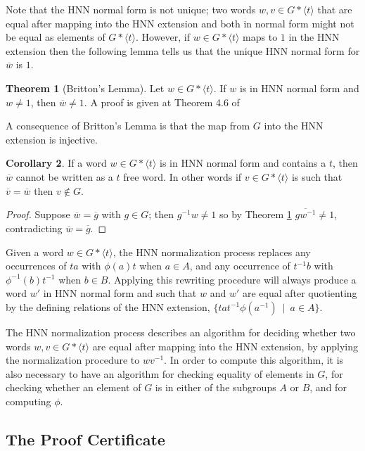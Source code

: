 \documentclass[12pt]{article} %
\theoremstyle{definition}
\newtheorem{thm}{Theorem}[subsubsection]
\theoremstyle{definition}
\newtheorem{corol}[thm]{Corollary}
\theoremstyle{definition}
\theoremstyle{definition}
\begin{document}
Note that the HNN normal form is not unique; two words $w, v \in G \ast \langle t \rangle$
that are equal after mapping into the HNN extension and both in normal form might not be
equal as elements of $G \ast \langle t \rangle$. However, if $w \in G \ast \langle t \rangle $
maps to $1$ in the HNN extension
then the following lemma tells us that the unique HNN normal form for $\overline{w}$ is $1$.

\begin{thm}[Britton's Lemma]\label{britton}
  Let $w \in G \ast \langle t \rangle$.
  If $w$ is in HNN normal form and $w \ne 1$, then
  $\overline{w} \ne 1$. A proof is given at Theorem 4.6 of \cite{infinitegroups}
\end{thm}

A consequence of Britton's Lemma is that the map from $G$ into the HNN extension
is injective.

\begin{corol}\label{genbritton}
  If a word $w \in G \ast \langle t \rangle$ is in HNN normal form and
  contains a $t$, then $\overline{w}$ cannot be written as a $t$ free word.
  In other words if $v \in G \ast \langle t \rangle$ is such that
  $\overline{v} = \overline{w}$ then $v \notin G$.
\end{corol}
\begin{proof}
Suppose $\overline{w} = \overline{g}$ with $g \in G$;
then $g^{-1}w \ne 1$ so by Theorem \ref{britton}
$\overline{gw^{-1}} \ne 1$, contradicting $\overline{w} = \overline{g}$.
\end{proof}
Given a word $w \in G \ast \langle t \rangle$, the HNN normalization process
replaces any occurrences of $ta$ with $\phi(a)t$ when $a \in A$, and
any occurrence of $t^{-1}b$ with $\phi^{-1}(b)t^{-1}$ when $b \in B$.
Applying this rewriting procedure will always produce a word $w'$ in HNN normal form and
such that $w$ and $w'$ are equal after quotienting by the defining relations
of the HNN extension, $\{ta t^{-1} \phi(a^{-1}) \ \mid \  a \in A\}$.

The HNN normalization process describes an algorithm for deciding
whether two words $w, v \in G \ast \langle t \rangle$ are equal
after mapping into the HNN extension, by applying the normalization procedure to
 $wv^{-1}$.
In order to compute this algorithm, it is also necessary to have an algorithm for checking equality
of elements in $G$,
for checking whether an element of $G$ is in either of the subgroups $A$ or $B$, and for computing $\phi$.

\subsection{The Proof Certificate}\label{proofcert}
\end{document}
